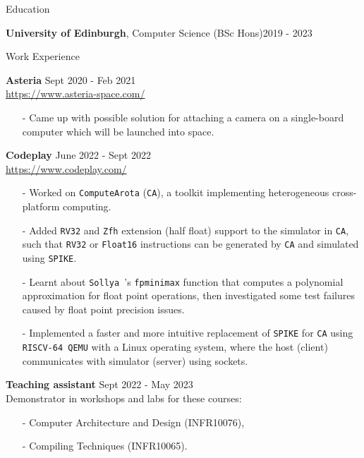 \documentclass{resume} %
\newcommand{\itemsepval}{-6pt}
\newcommand{\code}{\texttt}
\begin{document}
\begin{rSection}{Education}

{\bf  University of Edinburgh}, Computer Science (BSc Hons)\hfill {2019 - 2023}

\end{rSection}

\begin{rSection}{Work Experience}

    \textbf{Asteria} \hfill Sept 2020 - Feb 2021\\
    \url{https://www.asteria-space.com/} \hfill \par
    \begin{itemize}
        \itemsep \itemsepval {} 
        \item[-] Came up with possible solution for attaching a camera on a single-board computer which will be launched into space.
    \end{itemize}
     
    \textbf{Codeplay} \hfill June 2022 - Sept 2022 \\
    \url{https://www.codeplay.com/} \hfill \par
    \begin{itemize}
        \itemsep \itemsepval {} 
        \item[-] Worked on \code{ComputeArota} (\code{CA}), a toolkit implementing heterogeneous cross-platform computing.
        \item[-] Added \code{RV32} and \code{Zfh} extension (half float) support to the simulator in \code{CA}, such that \code{RV32} or \code{Float16} instructions can be generated by \code{CA} and simulated using \code{SPIKE}.
        \item[-] Learnt about \code{Sollya }’s \code{fpminimax} function that computes a polynomial approximation for float point operations, then investigated some test failures caused by float point precision issues.
        \item[-] Implemented a faster and more intuitive replacement of \code{SPIKE} for \code{CA} using \code{RISCV-64 QEMU} with a Linux operating system, where the host (client) communicates with simulator (server) using sockets. 
    \end{itemize}
      
    \textbf{Teaching assistant} \hfill Sept 2022 - May 2023     \\
    Demonstrator in workshops and labs for these courses: \hfill \par
    \begin{itemize}
        \itemsep \itemsepval {} 
        \item[-] Computer Architecture and Design (INFR10076), 
        \item[-] Compiling Techniques (INFR10065).
    \end{itemize}


\end{rSection} 
\end{document}

